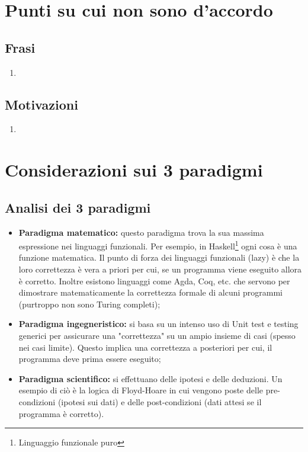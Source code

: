 \section{Punti su cui non sono d'accordo}
\subsection{Frasi}
\begin{enumerate}
    \item
\end{enumerate}

\subsection{Motivazioni}
\begin{enumerate}
    \item 
\end{enumerate}

\section{Considerazioni sui 3 paradigmi}
\subsection{Analisi dei 3 paradigmi}
\begin{itemize}
    \item \textbf{Paradigma matematico:} questo paradigma trova la sua massima espressione nei linguaggi funzionali. Per esempio, in Haskell\footnote{Linguaggio funzionale puro} ogni cosa è una funzione matematica. Il punto di forza dei linguaggi funzionali (lazy) è che la loro correttezza è vera a priori per cui, se un programma viene eseguito allora è corretto. Inoltre esistono linguaggi come Agda, Coq, etc. che servono per dimostrare matematicamente la correttezza formale di alcuni programmi (purtroppo non sono Turing completi);
    \item \textbf{Paradigma ingegneristico:} si basa su un intenso uso di Unit test e testing generici per assicurare una "correttezza" su un ampio insieme di casi (spesso nei casi limite). Questo implica una correttezza a posteriori per cui, il programma deve prima essere eseguito;
    \item \textbf{Paradigma scientifico:} si effettuano delle ipotesi e delle deduzioni. Un esempio di ciò è la logica di Floyd-Hoare in cui vengono poste delle pre-condizioni (ipotesi sui dati) e delle post-condizioni (dati attesi se il programma è corretto). 
\end{itemize}

